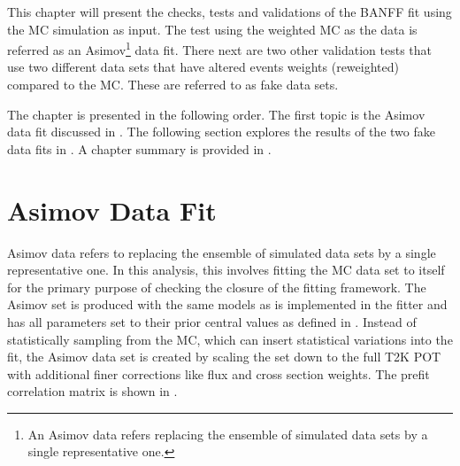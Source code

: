 This chapter will present the checks, tests and validations of the
BANFF fit using the MC simulation as input. The test using the weighted
MC as the data is referred as an Asimov\footnote{An Asimov data refers replacing the ensemble of simulated data sets
by a single representative one.} data fit\cite{Cowan:2010js}. There next are two other validation
tests that use two different data sets that have altered events weights
(reweighted) compared to the MC. These are referred to as fake data
sets.

The chapter is presented in the following order. The first topic is
the Asimov data fit discussed in .
The following section explores the results of the two fake data fits
in . A chapter summary is provided
in .


\section{Asimov Data Fit\label{sec:Asimov-Data-Fit}}

Asimov data refers to replacing the ensemble of simulated data sets
by a single representative one\cite{Cowan:2010js}. In this analysis,
this involves fitting the MC data set to itself for the primary purpose
of checking the closure of the fitting framework. The Asimov set is
produced with the same models as is implemented in the fitter and
has all parameters set to their prior central values as defined in
. Instead of statistically sampling from
the MC, which can insert statistical variations into the fit, the
Asimov data set is created by scaling the set down to the full T2K
POT with additional finer corrections like flux and cross section
weights. The prefit correlation matrix is shown in .

